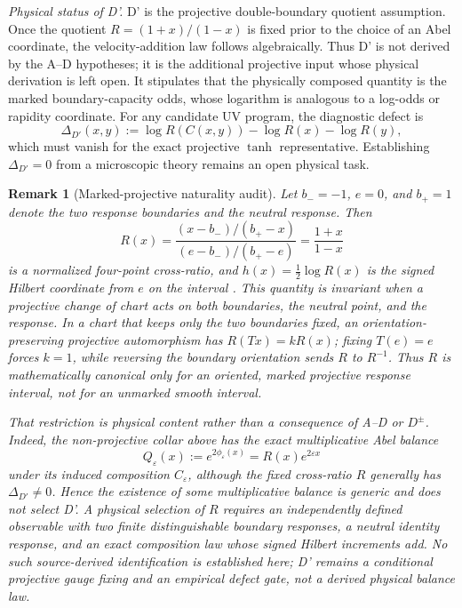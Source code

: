 \documentclass[aps,prd,twocolumn,superscriptaddress,nofootinbib]{revtex4-2}
\newtheorem{remark}{Remark}
\begin{document}
\textit{Physical status of D'.} D' is the projective double-boundary quotient assumption. Once the quotient $R=(1+x)/(1-x)$ is fixed prior to the choice of an Abel coordinate, the velocity-addition law follows algebraically. Thus D' is not derived by the A--D hypotheses; it is the additional projective input whose physical derivation is left open. It stipulates that the physically composed quantity is the marked boundary-capacity odds, whose logarithm is analogous to a log-odds or rapidity coordinate. For any candidate UV program, the diagnostic defect is
\[
  \Delta_{D'}(x,y):=\log R(C(x,y))-\log R(x)-\log R(y),
\]
which must vanish for the exact projective $\tanh$ representative. Establishing $\Delta_{D'}=0$ from a microscopic theory remains an open physical task.

\begin{remark}[Marked-projective naturality audit]
Let $b_-=-1$, $e=0$, and $b_+=1$ denote the two response boundaries and the neutral response. Then
\[
  R(x)=
  \frac{(x-b_-)/(b_+-x)}{(e-b_-)/(b_+-e)}
  =\frac{1+x}{1-x}
\]
is a normalized four-point cross-ratio, and $h(x)=\frac12\log R(x)$ is the signed Hilbert coordinate from $e$ on the interval \cite{PapadopoulosTroyanov2008,RainioVuorinen2023}. This quantity is invariant when a projective change of chart acts on both boundaries, the neutral point, and the response. In a chart that keeps only the two boundaries fixed, an orientation-preserving projective automorphism has $R(Tx)=kR(x)$; fixing $T(e)=e$ forces $k=1$, while reversing the boundary orientation sends $R$ to $R^{-1}$. Thus $R$ is mathematically canonical only for an oriented, marked projective response interval, not for an unmarked smooth interval.

That restriction is physical content rather than a consequence of A--D or $D^\pm$. Indeed, the non-projective collar above has the exact multiplicative Abel balance
\[
  Q_\varepsilon(x):=e^{2\phi_\varepsilon(x)}
  =R(x)e^{2\varepsilon x}
\]
under its induced composition $C_\varepsilon$, although the fixed cross-ratio $R$ generally has $\Delta_{D'}\neq0$. Hence the existence of \emph{some} multiplicative balance is generic and does not select D'. A physical selection of $R$ requires an independently defined observable with two finite distinguishable boundary responses, a neutral identity response, and an exact composition law whose signed Hilbert increments add. No such source-derived identification is established here; D' remains a conditional projective gauge fixing and an empirical defect gate, not a derived physical balance law.
\end{remark}
\end{document}
